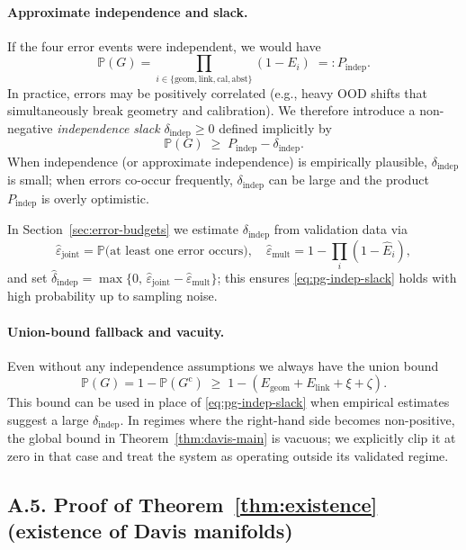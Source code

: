 \documentclass[11pt]{article}
\theoremstyle{remark}
\theoremstyle{plain}
\begin{document}
\paragraph{Approximate independence and slack.}
If the four error events were independent, we would have
\[
\mathbb{P}(G)
=
\prod_{i\in\{\mathrm{geom},\mathrm{link},\mathrm{cal},\mathrm{abst}\}}\!(1-E_i)
\;=:
P_{\mathrm{indep}}.
\]
In practice, errors may be positively correlated (e.g., heavy OOD shifts that simultaneously break
geometry and calibration).  We therefore introduce a non-negative \emph{independence slack}
$\delta_{\mathrm{indep}}\ge 0$ defined implicitly by
\begin{equation}
\mathbb{P}(G)
\;\ge\;
P_{\mathrm{indep}} - \delta_{\mathrm{indep}}.
\label{eq:pg-indep-slack}
\end{equation}
When independence (or approximate independence) is empirically plausible, $\delta_{\mathrm{indep}}$
is small; when errors co-occur frequently, $\delta_{\mathrm{indep}}$ can be large and the product
$P_{\mathrm{indep}}$ is overly optimistic.

In Section~\ref{sec:error-budgets} we estimate $\delta_{\mathrm{indep}}$ from validation data via
\[
\hat\varepsilon_{\mathrm{joint}}
=
\mathbb{P}\bigl(\text{at least one error occurs}\bigr),\quad
\hat\varepsilon_{\mathrm{mult}}
=
1-\prod_{i}(1-\hat E_i),
\]
and set $\hat\delta_{\mathrm{indep}} = \max\{0,\,\hat\varepsilon_{\mathrm{joint}}-\hat\varepsilon_{\mathrm{mult}}\}$;
this ensures \eqref{eq:pg-indep-slack} holds with high probability up to sampling noise.

\paragraph{Union-bound fallback and vacuity.}
Even without any independence assumptions we always have the union bound
\[
\mathbb{P}(G)
=
1-\mathbb{P}(G^{\mathrm{c}})
\;\ge\;
1-(E_{\mathrm{geom}} + E_{\mathrm{link}} + \xi + \zeta).
\]
This bound can be used in place of \eqref{eq:pg-indep-slack} when empirical estimates suggest a
large $\delta_{\mathrm{indep}}$.  In regimes where the right-hand side becomes non-positive, the global
bound in Theorem~\ref{thm:davis-main} is vacuous; we explicitly clip it at zero in that case and
treat the system as operating outside its validated regime.

\medskip

\subsection*{A.5. Proof of Theorem~\ref{thm:existence} (existence of Davis manifolds)}
\end{document}
